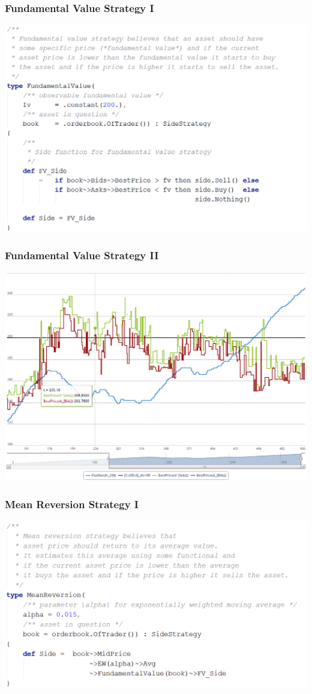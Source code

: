\documentclass{beamer}
\begin{document}
\begin{frame}
\frametitle{Fundamental Value Strategy I}
\includegraphics[width=1\linewidth]{fundamentalvalue_strategy.png}
\end{frame}
\begin{frame}
\frametitle{Fundamental Value Strategy II}
\includegraphics[width=1\linewidth]{fundamentalvalue.png}
\end{frame}
\begin{frame}
\frametitle{Mean Reversion Strategy I}
\includegraphics[width=1\linewidth]{meanreversion_strategy.png}
\end{frame}
\end{document}
